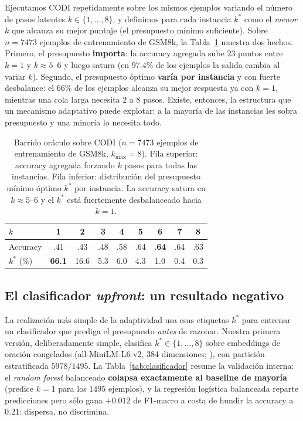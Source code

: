 \documentclass[11pt]{article}
\begin{document}
Ejecutamos CODI repetidamente sobre los mismos ejemplos variando el número de pasos latentes $k \in \{1,\dots,8\}$, y definimos para cada instancia $k^*$ como el \emph{menor} $k$ que alcanza su mejor puntaje (el presupuesto mínimo suficiente). Sobre $n{=}7473$ ejemplos de entrenamiento de GSM8k, la Tabla~\ref{tab:ksweep} muestra dos hechos. Primero, el presupuesto \textbf{importa}: la accuracy agregada sube $23$ puntos entre $k{=}1$ y $k{\approx}5$--$6$ y luego satura (en $97.4\%$ de los ejemplos la salida cambia al variar $k$). Segundo, el presupuesto óptimo \textbf{varía por instancia} y con fuerte desbalance: el $66\%$ de los ejemplos alcanza su mejor respuesta ya con $k{=}1$, mientras una cola larga necesita $2$ a $8$ pasos. Existe, entonces, la estructura que un mecanismo adaptativo puede explotar: a la mayoría de las instancias les sobra presupuesto y una minoría lo necesita todo.

\begin{table}[t]
  \centering
  \small
  \setlength{\tabcolsep}{4.2pt}
  \begin{tabular}{lcccccccc}
    \toprule
    $k$ & 1 & 2 & 3 & 4 & 5 & 6 & 7 & 8 \\
    \midrule
    Accuracy & .41 & .43 & .48 & .58 & .64 & \textbf{.64} & .64 & .63 \\
    $k^*$ (\%) & \textbf{66.1} & 16.6 & 5.3 & 6.0 & 4.3 & 1.0 & 0.4 & 0.3 \\
    \bottomrule
  \end{tabular}
  \caption{Barrido oráculo sobre CODI ($n{=}7473$ ejemplos de entrenamiento de GSM8k, $k_{\max}{=}8$). Fila superior: accuracy agregada forzando $k$ pasos para todas las instancias. Fila inferior: distribución del presupuesto mínimo óptimo $k^*$ por instancia. La accuracy satura en $k{\approx}5$--$6$ y el $k^*$ está fuertemente desbalanceado hacia $k{=}1$.}
  \label{tab:ksweep}
\end{table}

\subsection{El clasificador \textit{upfront}: un resultado negativo}
\label{sec:clasificador}

La realización más simple de la adaptividad usa esas etiquetas $k^*$ para entrenar un clasificador que prediga el presupuesto \emph{antes} de razonar. Nuestra primera versión, deliberadamente simple, clasifica $k^* \in \{1,\dots,8\}$ sobre embeddings de oración congelados (all-MiniLM-L6-v2, 384 dimensiones; \citealp{reimers2019sbert}), con partición estratificada $5978/1495$. La Tabla~\ref{tab:clasificador} resume la validación interna: el \textit{random forest} balanceado \textbf{colapsa exactamente al baseline de mayoría} (predice $k{=}1$ para los $1495$ ejemplos), y la regresión logística balanceada reparte predicciones pero sólo gana $+0.012$ de F1-macro a costa de hundir la accuracy a $0.21$: dispersa, no discrimina.
\end{document}
